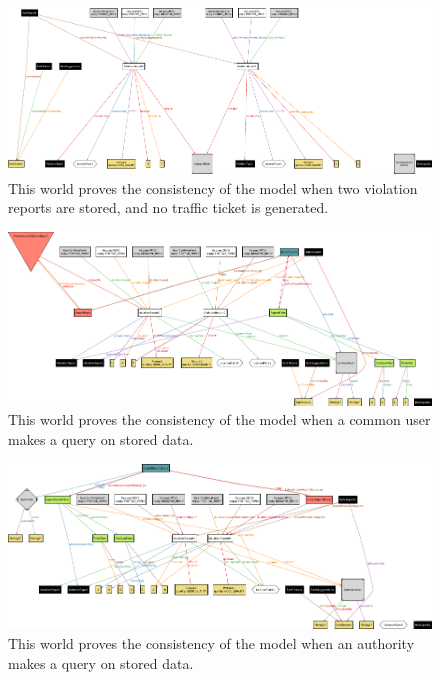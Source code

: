 \documentclass[a4paper]{article}
\begin{document}
\newpage



\begin{figure}[H]
\centering
\includegraphics[width=\textwidth]{alloy/world_accepted_violation}
\caption{This world proves the consistency of the model when two violation
reports are stored, and no traffic ticket is generated.}
\end{figure}

\newpage



\begin{figure}[H]
\centering
\includegraphics[width=\textwidth]{alloy/world_report_query}
\caption{This world proves the consistency of the model when a common user
makes a query on stored data.}
\end{figure}

\newpage



\begin{figure}[H]
\centering
\includegraphics[width=\textwidth]{alloy/world_super_report_query}
\caption{This world proves the consistency of the model when an authority
makes a query on stored data.}
\end{figure}
\end{document}
